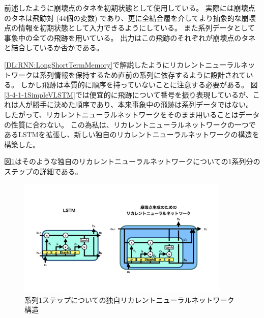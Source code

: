 前述したように崩壊点のタネを初期状態として使用している。
実際には崩壊点のタネは飛跡対 ($44$個の変数) であり、更に全結合層を介してより抽象的な崩壊点の情報を初期状態として入力できるようにしている。
また系列データとして事象中の全ての飛跡を用いている。
出力はこの飛跡のそれぞれが崩壊点のタネと結合しているか否かである。

\ref{DL:RNN:LongShortTermMemory}で解説したようにリカレントニューラルネットワークは系列情報を保持するため直前の系列に依存するように設計されている。
しかし飛跡は本質的に順序を持っていないことに注意する必要がある。
図\ref{3-4-1-1SimpleVLSTM}では便宜的に飛跡について番号を振り表現しているが、これは人が勝手に決めた順序であり、本来事象中の飛跡は系列データではない。
したがって、リカレントニューラルネットワークをそのまま用いることはデータの性質に合わない。
この為私は、リカレントニューラルネットワークの一つであるLSTMを拡張し、新しい独自のリカレントニューラルネットワークの構造を構築した。

図\ref{3-4-1-2VLSTMStructure}はそのような独自のリカレントニューラルネットワークについての1系列分のステップの詳細である。

\begin{figure}[htbp]
 \centering
 \includegraphics[trim = 0 100 0 200, width=0.9\textwidth, clip]{Figure/3Networks/3-4-1-2VLSTMStructure.png}
 \caption{系列1ステップについての独自リカレントニューラルネットワーク構造}
 \label{3-4-1-2VLSTMStructure}
\end{figure}

